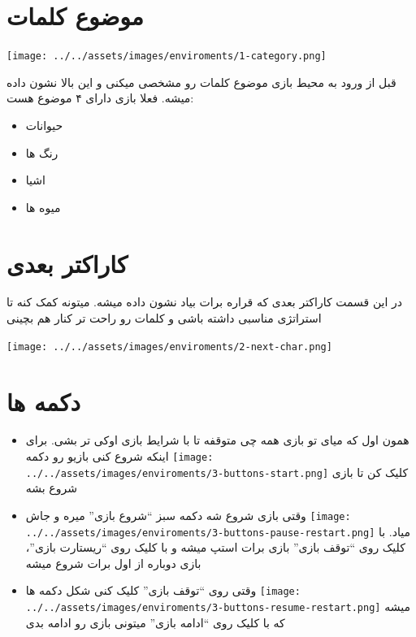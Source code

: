\documentclass[]{article}
\providecommand{\tightlist}{%
  \setlength{\itemsep}{0pt}\setlength{\parskip}{0pt}}
\begin{document}
\section{موضوع
کلمات}\label{ux645ux648ux636ux648ux639-ux6a9ux644ux645ux627ux62a-1}

\texttt{[image: ../../assets/images/enviroments/1-category.png]}

قبل از ورود به محیط بازی موضوع کلمات رو مشخصی میکنی و این بالا نشون داده
میشه. فعلا بازی دارای ۴ موضوع هست:

\begin{itemize}
\tightlist
\item
  حیوانات
\item
  رنگ ها
\item
  اشیا
\item
  میوه ها
\end{itemize}

\section{کاراکتر
بعدی}\label{ux6a9ux627ux631ux627ux6a9ux62aux631-ux628ux639ux62fux6cc}

در این قسمت کاراکتر بعدی که قراره برات بیاد نشون داده میشه. میتونه کمک
کنه تا استراتژی مناسبی داشته باشی و کلمات رو راحت تر کنار هم بچینی

\texttt{[image: ../../assets/images/enviroments/2-next-char.png]}

\section{دکمه ها}\label{ux62fux6a9ux645ux647-ux647ux627}

\begin{itemize}
\item
  همون اول که میای تو بازی همه چی متوقفه تا با شرایط بازی اوکی تر بشی.
  برای اینکه شروع کنی بازیو رو دکمه
  \texttt{[image: ../../assets/images/enviroments/3-buttons-start.png]}
  کلیک کن تا بازی شروع بشه
\item
  وقتی بازی شروع شه دکمه سبز ``شروع بازی'' میره و جاش
  \texttt{[image: ../../assets/images/enviroments/3-buttons-pause-restart.png]}
  میاد. با کلیک روی ``توقف بازی'' بازی برات استپ میشه و با کلیک روی
  ``ریستارت بازی''، بازی دوباره از اول برات شروع میشه
\item
  وقتی روی ``توقف بازی'' کلیک کنی شکل دکمه ها
  \texttt{[image: ../../assets/images/enviroments/3-buttons-resume-restart.png]}
  میشه که با کلیک روی ``ادامه بازی'' میتونی بازی رو ادامه بدی
\end{itemize}
\end{document}
